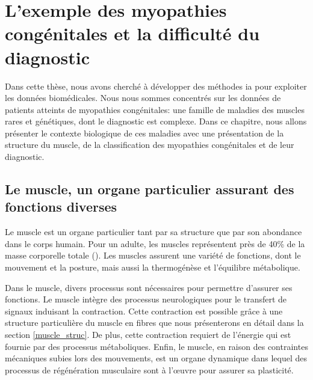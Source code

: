 \chapter{L’exemple des myopathies congénitales et la difficulté du diagnostic}
Dans cette thèse, nous avons cherché à développer des méthodes \gls{ia} pour exploiter les données biomédicales. Nous nous sommes concentrés sur les données de patients atteints de myopathies congénitales: une famille de maladies des muscles rares et génétiques, dont le diagnostic est complexe. Dans ce chapitre, nous allons présenter le contexte biologique de ces maladies avec une présentation de la structure du muscle, de la classification des myopathies congénitales et de leur diagnostic.

\section{Le muscle, un organe particulier assurant des fonctions diverses}
Le muscle est un organe particulier tant par sa structure que par son abondance dans le corps humain. Pour un adulte, les muscles représentent près de 40\% de la masse corporelle totale (\cite{janssen_skeletal_2000}). Les muscles assurent une variété de fonctions, dont le mouvement et la posture, mais aussi la thermogénèse et l'équilibre métabolique.

Dans le muscle, divers processus sont nécessaires pour permettre d'assurer ses fonctions. Le muscle intègre des processus neurologiques pour le transfert de signaux induisant la contraction. Cette contraction est possible grâce à une structure particulière du muscle en fibres que nous présenterons en détail dans la section \ref{muscle_struc}. De plus, cette contraction requiert de l'énergie qui est fournie par des processus métaboliques. Enfin, le muscle, en raison des contraintes mécaniques subies lors des mouvements, est un organe dynamique dans lequel des processus de régénération musculaire sont à l'œuvre pour assurer sa plasticité.

